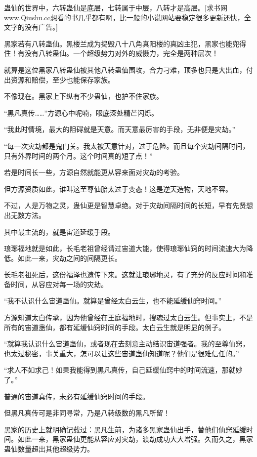 \begin{this_body}
蛊仙的世界中，六转蛊仙是底层，七转属于中层，八转才是高层。[求书网www.Qiushu.cc想看的书几乎都有啊，比一般的小说网站要稳定很多更新还快，全文字的没有广告。]

黑家若有八转蛊仙。黑楼兰成为捣毁八十八角真阳楼的真凶主犯，黑家也能兜得住！有没有八转蛊仙。一个超级势力对外的威慑力，完全是两种层次！

就算是这位黑家八转蛊仙被其他八转蛊仙围攻，合力刁难，顶多也只是大出血，付出资源和赔偿，至少也能保存家族。

不像现在。黑家上下纵有不少蛊仙，也护不住家族。

“黑凡真传……”方源心中呢喃，眼底深处精芒闪烁。

“我此时情境，最大的阻碍就是天意。而天意最厉害的手段，无非便是灾劫。”

“每一次灾劫都是鬼门关。我太被天意针对，过于危险。而且每个灾劫间隔时间，只有外界时间的两个月。这个时间真的短了点！”

若是时间长一些，方源自然就能更从容来面对灾劫的考验。

但方源资质如此，谁叫这至尊仙胎太过于变态！这是逆天造物，天地不容。

不过，人是万物之灵，蛊仙更是智慧卓绝。对于灾劫间隔时间的长短，早有先贤想出无数方法。

其中最主流的，就是宙道延缓手段。

琅琊福地就是如此，长毛老祖曾经请过宙道大能，使得琅琊仙窍的时间流速大为降低。如此一来，灾劫之间的间隔更长。

长毛老祖死后，这份福泽也遗传下来。这就让琅琊地灵，有了充分的反应时间和准备时间，从容应对每一场的灾劫。

“我不认识什么宙道蛊仙。就算是曾经太白云生，也不能延缓仙窍时间。”

方源知道太白传承，因为他曾经在王庭福地时，搜魂过太白云生。但事实上，不是所有的宙道蛊仙，都有延缓仙窍时间的手段。太白云生就是明显的例子。

“就算我认识什么宙道蛊仙，或者现在去刻意主动结识宙道强者。我的至尊仙窍，也太过秘密，事关重大，怎可以让这些宙道蛊仙知道呢？他们是很难信任的。”

“求人不如求己！如果我能得到黑凡真传，自己延缓仙窍中的时间流速，那就妙了。”

普通的宙道真传，未必有延缓仙窍时间的手段。

但黑凡真传可是非同寻常，乃是八转级数的黑凡所留！

黑家的历史上就明确记载过：黑凡生前，为诸多黑家蛊仙出手，替他们仙窍延缓时间。如此一来，黑家蛊仙更能从容应对灾劫，渡劫成功大大增强。久而久之，黑家蛊仙数量超出其他超级势力。


\end{this_body}
